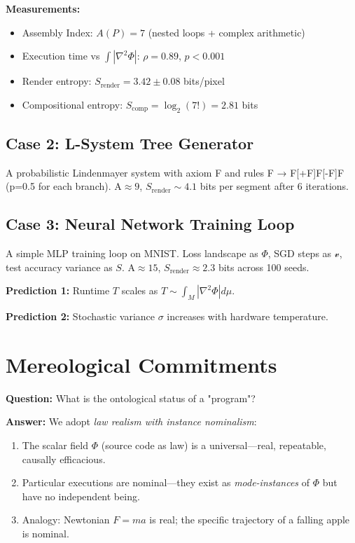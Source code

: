 \documentclass[12pt,a4paper]{article}
\theoremstyle{plain}
\theoremstyle{definition}
\theoremstyle{remark}
\newcommand{\Phifield}{\Phi}
\newcommand{\vfield}{\mathcal{v}}
\newcommand{\Sfield}{S}
\newcommand{\AI}{\mathrm{A}}
\begin{document}
\textbf{Measurements:}
\begin{itemize}
\item Assembly Index: $A(P) = 7$ (nested loops + complex arithmetic)
\item Execution time vs $\int |\nabla^2 \Phi|$: $\rho = 0.89$, $p < 0.001$
\item Render entropy: $S_{\text{render}} = 3.42 \pm 0.08$ bits/pixel
\item Compositional entropy: $S_{\text{comp}} = \log_2(7!) = 2.81$ bits
\end{itemize}

\subsection{Case 2: L-System Tree Generator}
A probabilistic Lindenmayer system with axiom F and rules F → F[+F]F[-F]F (p=0.5 for each branch). $\AI \approx 9$, $S_{\text{render}} \sim 4.1$ bits per segment after 6 iterations.

\subsection{Case 3: Neural Network Training Loop}
A simple MLP training loop on MNIST. Loss landscape as $\Phifield$, SGD steps as $\vfield$, test accuracy variance as $\Sfield$. $\AI \approx 15$, $S_{\text{render}} \approx 2.3$ bits across 100 seeds.

\textbf{Prediction 1:} Runtime $T$ scales as $T \sim \int_M |\nabla^2 \Phi| d\mu$.

\textbf{Prediction 2:} Stochastic variance $\sigma$ increases with hardware temperature.

\section{Mereological Commitments}
\label{sec:mereology}

\textbf{Question:} What is the ontological status of a "program"?

\textbf{Answer:} We adopt \textit{law realism with instance nominalism}:
\begin{enumerate}
\item The scalar field $\Phifield$ (source code as law) is a universal—real, repeatable, causally efficacious.
\item Particular executions are nominal—they exist as \textit{mode-instances} of $\Phifield$ but have no independent being.
\item Analogy: Newtonian $F = ma$ is real; the specific trajectory of a falling apple is nominal.
\end{enumerate}
\end{document}
